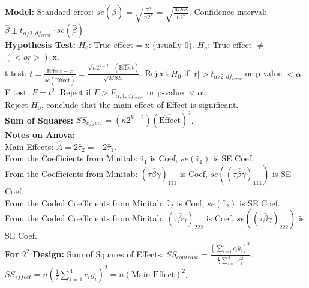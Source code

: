 \documentclass[10pt]{article}
\begin{document}
    \textbf{Model:}  Standard error: $se(\hat{\beta})= \sqrt{\frac{\sigma^2}{n2^k}} = \sqrt{\frac{MSE}{n2^k}}$. 
    Confidence interval: $\hat{\beta} \pm t_{\alpha/2, df_{error}} \cdot se(\hat{\beta})$\\
    \textbf{Hypothesis Test: } $H_0$: True effect = x (usually 0). $H_a$: True effect $\neq$ $(< or >)$ x. \\
    t test: $t = \frac{\hat{\text{Effect}} - x}{se(\hat{\text{Effect}})} = \frac{\sqrt{n2^{k-2}} \cdot (\hat{\text{Effect}})}{\sqrt{MSE}}$. 
    Reject $H_0$ if $\left| t \right| > t_{\alpha/2, df_{error}}$ or p-value $< \alpha$. \\
    F test: $F = t^2$. Reject if $F > F_{\alpha, 1, df_{error}}$ or p-value $< \alpha$. \\
    Reject $H_0$, conclude that the main effect of {Effect} is significant. \\
    \textbf{Sum of Squares:} $SS_{effect} = (n2^{k-2})(\hat{\text{Effect}})^2$. \\
    \textbf{Notes on Anova: } \\
    Main Effects: $\hat{A} = 2\hat{\tau}_2 = -2\hat{\tau}_1$. \\
    From the Coefficients from Minitab: $\hat{\tau}_1$ is Coef, $se(\hat{\tau}_1)$ is SE Coef. \\
    From the Coefficients from Minitab: $(\hat{\tau \beta \gamma})_{111}$ is Coef, $se((\hat{\tau \beta \gamma})_{111})$ is SE Coef. \\
    From the Coded Coefficients from Minitab: $\hat{\tau}_2$ is Coef, $se(\hat{\tau}_2)$ is SE Coef. \\
    From the Coded Coefficients from Minitab: $(\hat{\tau \beta \gamma})_{222}$ is Coef, $se((\hat{\tau \beta \gamma})_{222})$ is SE Coef. \\
    
    \textbf{For $2^2$ Design: } Sum of Squares of Effects: $SS_{contrast} = \frac{\left( \sum_{i=1}^{4} c_i \bar{y}_i \right)^2}{\frac{1}{n} \sum_{i=1}^{4}c_i^2}$. $SS_{effect} = n(\frac{1}{2} \sum_{i=1}^{4}c_i\bar{y}_i)^2 = n(\text{Main Effect})^2$.\\
    
    
    
    
\end{document}

